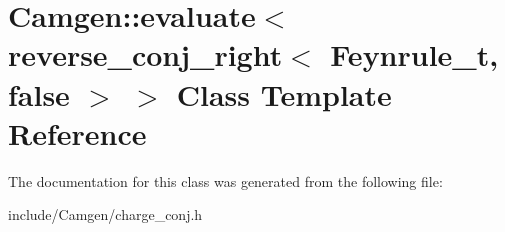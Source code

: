 \hypertarget{a00185}{\section{Camgen\-:\-:evaluate$<$ reverse\-\_\-conj\-\_\-right$<$ Feynrule\-\_\-t, false $>$ $>$ Class Template Reference}
\label{a00185}
}


The documentation for this class was generated from the following file\-:\begin{DoxyCompactItemize}
\item 
include/\-Camgen/charge\-\_\-conj.\-h\end{DoxyCompactItemize}
